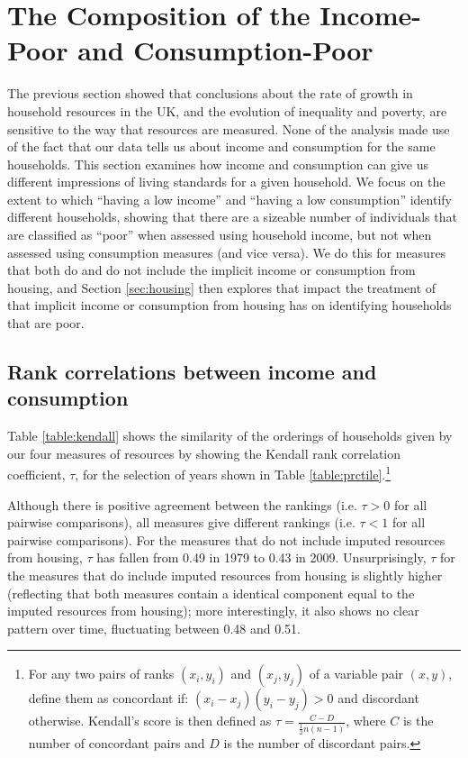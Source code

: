 \section{The Composition of the Income-Poor and Consumption-Poor}\label{sec:composition}

The previous section showed that conclusions about the rate of growth in household resources in the UK, and the evolution of inequality and poverty, are sensitive to the way that resources are measured. None of the analysis made use of the fact that our data tells us about income and consumption for the same households. This section examines how income and consumption can give us different impressions of living standards for a given household.  We focus on the extent to which ``having a low income'' and ``having a low consumption'' identify different households, showing that there are a sizeable number of individuals that are classified as ``poor'' when assessed using household income, but not when assessed using consumption measures (and vice versa). We do this for measures that both do and do not include the implicit income or consumption from housing, and Section \ref{sec:housing} then explores that impact the treatment of that implicit income or consumption from housing has on identifying households that are poor.

\subsection{Rank correlations between income and consumption}


Table \ref{table:kendall} shows the similarity of the orderings of households given by our four measures of resources by showing the Kendall rank correlation coefficient, $\tau$, for the selection of years shown in Table \ref{table:prctile}.\footnote{For any two pairs of ranks $(x_{i},y_{i})$ and $(x_{j},y_{j})$ of a variable pair $(x, y)$, define them as concordant if: $(x_{i}-x_{j})(y_{i} - y_{j}) > 0$ and discordant otherwise. Kendall's score is then defined as $\tau = \frac{C-D}{\frac{1}{2}n(n-1)}$, where $C$ is the number of concordant pairs and $D$ is the number of discordant pairs.}

Although there is positive agreement between the rankings (i.e. $\tau>0$ for all pairwise comparisons), all measures give different rankings (i.e. $\tau<1$ for all pairwise comparisons). For the measures that do not include imputed resources from housing, $\tau$ has fallen from 0.49 in 1979 to 0.43 in 2009. Unsurprisingly, $\tau$ for the measures that do include imputed resources from housing is slightly higher (reflecting that both measures contain a identical component equal to the imputed resources from housing); more interestingly, it also shows no clear pattern over time, fluctuating between 0.48 and 0.51.

